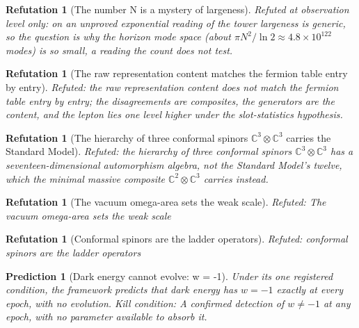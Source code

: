 \documentclass[11pt]{article}
\newtheorem{refutation}[theorem]{Refutation}
\newtheorem{prediction}[theorem]{Prediction}
\theoremstyle{definition}
\theoremstyle{plain}
\providecommand{\C}{}\renewcommand{\C}{\mathbb{C}}
\begin{document}
\begin{refutation}[The number N is a mystery of largeness]\label{c:refuted.the-number-n-is-a-mystery-of-largeness}
Refuted at observation level only: on an unproved exponential reading of the tower largeness is generic, so the question is why the horizon mode space (about $\pi N^{2}/\ln 2 \approx 4.8 \times 10^{122}$ modes) is so small, a reading the count does not test.
\end{refutation}

\begin{refutation}[The raw representation content matches the fermion table entry by entry]\label{c:refuted.the-raw-representation-content-matches-the-fermi}
Refuted: the raw representation content does not match the fermion table entry by entry; the disagreements are composites, the generators are the content, and the lepton lies one level higher under the slot-statistics hypothesis.
\end{refutation}

\begin{refutation}[The hierarchy of three conformal spinors $\mathbb{C}^{3}\otimes\mathbb{C}^{3}$ carries the Standard Model]\label{c:refuted.the-three-twistor-hierarchy-carries-the-standard}
Refuted: the hierarchy of three conformal spinors $\C^{3}\otimes\C^{3}$ has a seventeen-dimensional automorphism algebra, not the Standard Model's twelve, which the minimal massive composite $\C^{2}\otimes\C^{3}$ carries instead.
\end{refutation}

\begin{refutation}[The vacuum omega-area sets the weak scale]\label{c:refuted.the-vacuum-omega-area-sets-the-weak-scale}
Refuted: The vacuum omega-area sets the weak scale
\end{refutation}

\begin{refutation}[Conformal spinors are the ladder operators]\label{c:refuted.twistors-are-the-ladder-operators}
Refuted: conformal spinors are the ladder operators
\end{refutation}

\begin{prediction}[Dark energy cannot evolve: w = -1]\label{c:pred.dark-energy-w-minus-one}
Under its one registered condition, the framework predicts that dark energy has $w = -1$ exactly at every epoch, with no evolution.
\emph{Kill condition:} A confirmed detection of $w \neq -1$ at any epoch, with no parameter available to absorb it.
\end{prediction}
\end{document}
